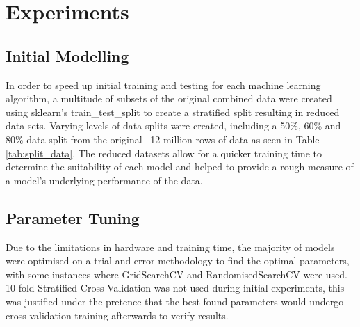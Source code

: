 
\section{Experiments}
\label{sec: Experiments}

\subsection{Initial Modelling}
In order to speed up initial training and testing for each machine learning algorithm, a multitude of subsets of the original combined data were created using sklearn's train\_test\_split to create a stratified split resulting in reduced data sets. Varying levels of data splits were created, including a 50\%, 60\% and 80\% data split from the original ~12 million rows of data as seen in Table \ref{tab:split_data}. The reduced datasets allow for a quicker training time to determine the suitability of each model and helped to provide a rough measure of a model's underlying performance of the data.


\subsection{Parameter Tuning}
Due to the limitations in hardware and training time, the majority of models were optimised on a trial and error methodology to find the optimal parameters, with some instances where GridSearchCV and RandomisedSearchCV were used. 10-fold Stratified Cross Validation was not used during initial experiments, this was justified under the pretence that the best-found parameters would undergo cross-validation training afterwards to verify results.

